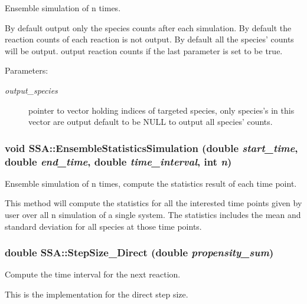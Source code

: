 Ensemble simulation of n times. 

By default output only the species counts after each simulation. By default the reaction counts of each reaction is not output. By default all the species' counts will be output. output reaction counts if the last parameter is set to be true. \begin{Desc}
\item[Parameters:]
\begin{description}
\item[{\em output\_\-species}]pointer to vector holding indices of targeted species, only species's in this vector are output default to be NULL to output all species' counts. \end{description}
\end{Desc}
\hypertarget{class_s_s_a_b682c0d7ecc8542d605f226a164e110e}{
\subsubsection{\setlength{\rightskip}{0pt plus 5cm}void SSA::EnsembleStatisticsSimulation (double {\em start\_\-time}, \/  double {\em end\_\-time}, \/  double {\em time\_\-interval}, \/  int {\em n})}}
\label{class_s_s_a_b682c0d7ecc8542d605f226a164e110e}


Ensemble simulation of n times, compute the statistics result of each time point. 

This method will compute the statistics for all the interested time points given by user over all n simulation of a single system. The statistics includes the mean and standard deviation for all species at those time points. \hypertarget{class_s_s_a_cf4d8a1bce824e370003474bacc5e2f9}{
\subsubsection{\setlength{\rightskip}{0pt plus 5cm}double SSA::StepSize\_\-Direct (double {\em propensity\_\-sum})}}
\label{class_s_s_a_cf4d8a1bce824e370003474bacc5e2f9}


Compute the time interval for the next reaction. 

This is the implementation for the direct step size.

